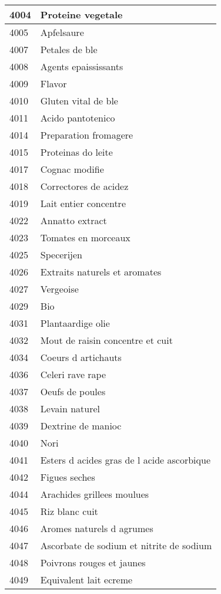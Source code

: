 \begin{longtable}{|l|l|}
4004 & Proteine vegetale \\ \hline 
4005 & Apfelsaure \\ \hline 
4007 & Petales de ble \\ \hline 
4008 & Agents epaississants \\ \hline 
4009 & Flavor \\ \hline 
4010 & Gluten vital de ble \\ \hline 
4011 & Acido pantotenico \\ \hline 
4014 & Preparation fromagere \\ \hline 
4015 & Proteinas do leite \\ \hline 
4017 & Cognac modifie \\ \hline 
4018 & Correctores de acidez \\ \hline 
4019 & Lait entier concentre \\ \hline 
4022 & Annatto extract \\ \hline 
4023 & Tomates en morceaux \\ \hline 
4025 & Specerijen \\ \hline 
4026 & Extraits naturels et aromates \\ \hline 
4027 & Vergeoise \\ \hline 
4029 & Bio \\ \hline 
4031 & Plantaardige olie \\ \hline 
4032 & Mout de raisin concentre et cuit \\ \hline 
4034 & Coeurs d artichauts \\ \hline 
4036 & Celeri rave rape \\ \hline 
4037 & Oeufs de poules \\ \hline 
4038 & Levain naturel \\ \hline 
4039 & Dextrine de manioc \\ \hline 
4040 & Nori \\ \hline 
4041 & Esters d acides gras de l acide ascorbique \\ \hline 
4042 & Figues seches \\ \hline 
4044 & Arachides grillees moulues \\ \hline 
4045 & Riz blanc cuit \\ \hline 
4046 & Aromes naturels d agrumes \\ \hline 
4047 & Ascorbate de sodium et nitrite de sodium \\ \hline 
4048 & Poivrons rouges et jaunes \\ \hline 
4049 & Equivalent lait ecreme \\ \hline 

\end{longtable}
